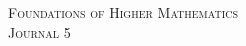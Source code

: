 \documentclass{article}
\begin{document}

\begin{center}
\textsc{\Large Foundations of Higher Mathematics}\\[.3cm]
\textsc{\Large Journal 5}\\[1cm]
\end{center}

\end{document}

